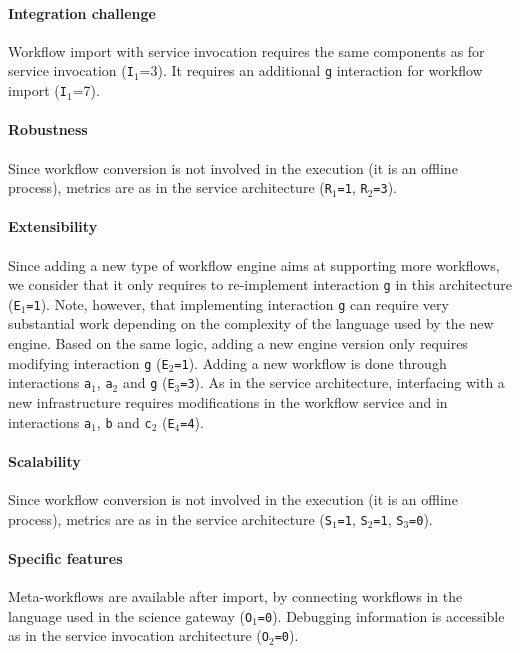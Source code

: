 \documentclass[preprint,3p,twocolumn]{elsarticle}
\begin{document}
\paragraph{Integration challenge} Workflow import with service invocation
requires the same components as for service invocation
(\texttt{I$_1$}=3). It requires an additional \texttt{g} interaction
for workflow import (\texttt{I$_1$}=7).

\paragraph{Robustness} Since workflow conversion is not involved in
the execution (it is an offline process), metrics are as in the
service architecture (\texttt{R$_1$=1}, \texttt{R$_2$=3}).

\paragraph{Extensibility} Since adding a new type of workflow engine
aims at supporting more workflows, we consider that it only requires
to re-implement interaction \texttt{g} in this architecture  (\texttt{E$_1$=1}). Note,
however, that implementing interaction \texttt{g} can require very
substantial work depending on the complexity of the language used by
the new engine. Based on the same logic, adding a
new engine version only requires modifying interaction \texttt{g}
(\texttt{E$_2$=1}).  Adding a new workflow is done through
interactions \texttt{a$_1$}, \texttt{a$_2$} and \texttt{g} (\texttt{E$_3$=3}). As in the
service architecture, interfacing with a new infrastructure requires
modifications in the workflow service and in interactions \texttt{a$_1$}, \texttt{b}
and \texttt{c$_2$} (\texttt{E$_4$=4}).

\paragraph{Scalability}  Since workflow conversion is not involved in
the execution (it is an offline process), metrics are as in the
service architecture (\texttt{S$_1$=1},
\texttt{S$_2$=1}, \texttt{S$_3$=0}).

\paragraph{Specific features} Meta-workflows are available after import,
by connecting workflows in the language used in the science gateway
(\texttt{O$_1$=0}). Debugging information is accessible as in the
service invocation architecture (\texttt{O$_2$=0}).
\end{document}
